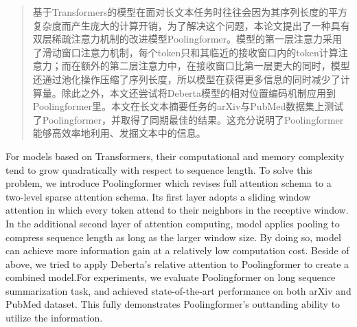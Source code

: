 ﻿%


\begin{abstract}

基于Transformers的模型在面对长文本任务时往往会因为其序列长度的平方复杂度而产生庞大的计算开销，为了解决这个问题，本论文提出了一种具有双层稀疏注意力机制的改进模型Poolingformer。模型的第一层注意力采用了滑动窗口注意力机制，每个token只和其临近的接收窗口内的token计算注意力；而在额外的第二层注意力中，在接收窗口比第一层更大的同时，模型还通过池化操作压缩了序列长度，所以模型在获得更多信息的同时减少了计算量。除此之外，本文还尝试将Deberta模型的相对位置编码机制应用到Poolingformer里。本文在长文本摘要任务的arXiv与PubMed数据集上测试了Poolingformer，并取得了同期最佳的结果。这充分说明了Poolingformer能够高效率地利用、发掘文本中的信息。

\end{abstract}

\begin{abstract*}

For models based on Transformers, their computational and memory complexity tend to grow quadratically with respect to sequence length. To solve this problem, we introduce Poolingformer which revises full attention schema to a two-level sparse attention schema. Its first layer adopts a sliding window attention in which every token attend to their neighbors in the receptive window. In the additional second layer of attention computing, model applies pooling to compress sequence length as long as the larger window size. By doing so, model can achieve more information gain at a relatively low computation cost. Beside of above, we tried to apply Deberta's relative attention to Poolingformer to create a combined model.For experiments, 
we evaluate Poolingformer on long sequence summarization task, and achieved state-of-the-art performance on both arXiv and PubMed dataset. This fully demonstrates Poolingformer's outtanding ability to utilize the information.

\end{abstract*}